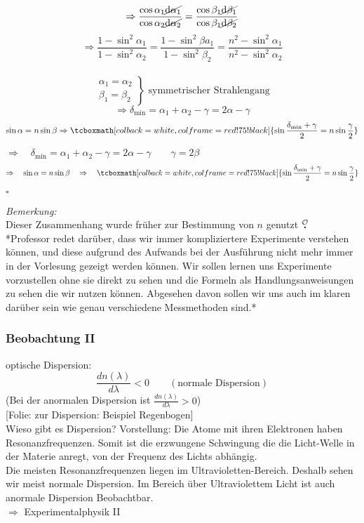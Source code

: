 \documentclass[titlepage,11pt,a4paper,ngerman]{report}
\newcommand{\tx}[1]{\textrm{#1}}
\newcommand{\folie}[1]{\color{gray}[Folie: #1]\color{black}}
\newcommand{\lcom}[1]{\color{MidnightBlue}#1\color{black}}
\newcommand{\mau}{$\buildrel \mathcal{O} \over{\textbf{.}}$}
\newcommand{\rmbox}[1]{\tcboxmath[colback=white,colframe=red!75!black]{#1}}
\begin{document}
$$\Rightarrow\frac{\cos\alpha_1\cancel{\tx{d}\alpha_1}}{\cos\alpha_2\cancel{\tx{d}\alpha_2}}=\frac{\cos\beta_1\cancel{\tx{d}\beta_1}}{\cos\beta_1\cancel{\tx{d}\beta_2}}$$
$$\Rightarrow\frac{1-\sin^2\alpha_1}{1-\sin^2\alpha_2}=\frac{1-\sin^2\beta  a_1}{1-\sin^2\beta_2}=\frac{n^2-\sin^2\alpha_1}{n^2-\sin^2\alpha_2}$$\\[-10pt]
$$\left.\begin{array}{c}
\alpha_1=\alpha_2 \\
\beta_1=\beta_2\end{array} \right\} \textrm{ symmetrischer Strahlengang}$$
$$\Rightarrow\delta_\tx{min}=\alpha_1+\alpha_2-\gamma=2\alpha-\gamma$$
$$\sin\alpha=n\sin\beta\Rightarrow\rmbox{\sin\frac{\delta_\tx{min}+\gamma}{2}  =n\sin\frac{\gamma}{2}}$$

\noindent
$ \Rightarrow \quad \delta_{\tx{min}} = \alpha_1 + \alpha_2 - \gamma = 2 \alpha - \gamma \qquad \gamma = 2 \beta $
\begin{equation*}
\Rightarrow \quad \sin \alpha = n \sin \beta \quad \Rightarrow \quad \rmbox{\sin \frac{\delta_{\tx{min}} + \gamma}{2} = n \sin \frac{\gamma}{2}}
\end{equation*}
\begin{flushright}
	$ \square $
\end{flushright}
\emph{Bemerkung:}\\
Dieser Zusammenhang wurde früher zur Bestimmung von $ n $ genutzt \mau\\
\lcom{*Professor redet darüber, dass wir immer kompliziertere Experimente verstehen können, und diese aufgrund des Aufwands bei der Ausführung nicht mehr immer in der Vorlesung gezeigt werden können. Wir sollen lernen uns Experimente vorzustellen ohne sie direkt zu sehen und die Formeln als Handlungsanweisungen zu sehen die wir nutzen können. Abgesehen davon sollen wir uns auch im klaren darüber sein wie genau verschiedene Messmethoden sind.*}

\subsubsection{Beobachtung II}
optische Dispersion:
\begin{equation*}
\frac{dn(\lambda)}{d\lambda} < 0 \qquad (\tx{normale Dispersion})
\end{equation*}
(Bei der anormalen Dispersion ist $ \frac{d n(\lambda)}{d\lambda} > 0 $)\\
\folie{zur Dispersion: Beispiel Regenbogen}\\[5pt]
\lcom{Wieso gibt es Dispersion? Vorstellung: Die Atome mit ihren Elektronen haben Resonanzfrequenzen. Somit ist die erzwungene Schwingung die die Licht-Welle in der Materie anregt, von der Frequenz des Lichts abhängig.\\
Die meisten Resonanzfrequenzen liegen im Ultravioletten-Bereich. Deshalb sehen wir meist normale Dispersion. Im Bereich über Ultraviolettem Licht ist auch anormale Dispersion Beobachtbar.}\\[5pt]
$ \Rightarrow $ Experimentalphysik II
\end{document}
